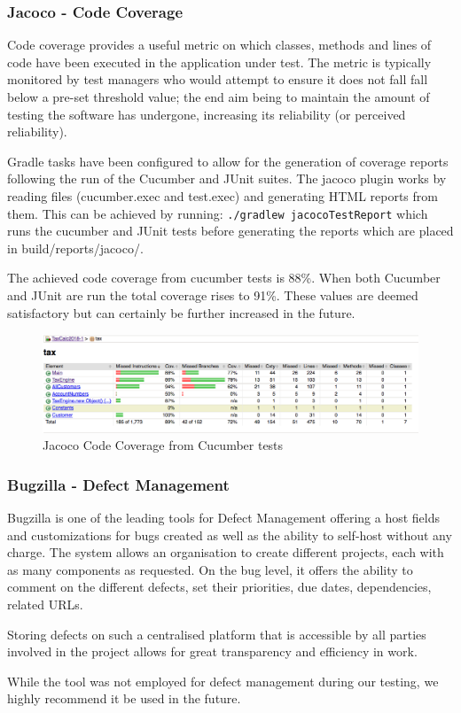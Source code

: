 \subsubsection{Jacoco - Code Coverage}
Code coverage provides a useful metric on which classes, methods and lines of code have been executed in the application under test. 
The metric is typically monitored by test managers who would attempt to ensure it does not fall fall below a pre-set threshold value; the end aim being to maintain the amount of testing the software has undergone, increasing its  reliability (or perceived reliability).  
\par
Gradle tasks have been configured to allow for the generation of coverage reports following the run of the Cucumber and JUnit suites. The jacoco plugin works by reading files (cucumber.exec and test.exec) and generating HTML reports from them. This can be achieved by running: 
\lstinline{./gradlew jacocoTestReport} which runs the cucumber and JUnit tests before generating the reports which are placed in build/reports/jacoco/. 
\par 
The achieved code coverage from cucumber tests is 88\%. 
When both Cucumber and JUnit are run the total coverage rises to 91\%. These values are deemed satisfactory but can certainly be further increased in the future.
\begin{figure}[H]
\centering
\includegraphics[scale=0.4]{res/cucumber-coverage.png}
\caption{Jacoco Code Coverage from Cucumber tests}
\end{figure}

\subsubsection{Bugzilla - Defect Management}
Bugzilla is one of the leading tools for Defect Management offering a host fields and customizations for bugs created as well as the ability to self-host without any charge. 
The system allows an organisation to create different projects, each with as many components as requested. On the bug level, it offers the ability to comment on the different defects, set their priorities, due dates, dependencies, related URLs.
\par 
Storing defects on such a centralised platform that is accessible by all parties involved in the project allows for great transparency and efficiency in work. 
\par 
While the tool was not employed for defect management during our testing, we highly recommend it be used in the future. 